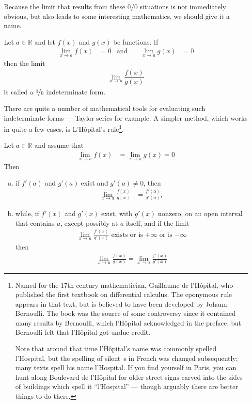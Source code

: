 Because the limit that results from these $0/0$ situations is not immediately obvious,
but also leads to some interesting mathematics, we should give it a name.
\begin{defn}
Let $a \in \mathbb{R}$ and let $f(x)$ and $g(x)$ be functions. If
\begin{align*}
  \lim_{x\to a} f(x) &= 0 & \text{and } &&
  \lim_{x\to a} g(x) &= 0
\end{align*}
then the limit
\begin{align*}
  \lim_{x\to a} \dfrac{f(x)}{g(x)}
\end{align*}
is called a $\nicefrac{0}{0}$ indeterminate form.
\end{defn}
There are quite a number of mathematical tools for evaluating such indeterminate forms
--- Taylor series for example. A simpler method, which works in quite a few cases, is
L'H\^opital's rule\footnote{
  Named for the 17th century mathematician, Guillaume de l'H\^opital, who published the
first textbook on differential calculus. The eponymous rule appears in that text, but is
believed to have been developed by Johann Bernoulli. The book was the source of some
controversy since it contained many results by Bernoulli, which l'H\^opital acknowledged
in the preface, but Bernoulli felt that l'H\^opital got undue credit.

Note that around that time l'H\^opital's name was commonly spelled l'Hospital, but the
spelling of silent~s in French was changed subsequently; many texts spell his
name l'Hospital. If you find yourself in Paris, you can hunt along Boulevard
de l'H\^opital for older street signs carved into the sides of buildings
which spell it ``l'Hospital'' --- though arguably there are better things to do
there.}.
\begin{theorem}\label{thm:APPlhopital}
Let $a\in\mathbb{R}$ and assume that
\begin{align*}
\lim_{x\to a}f(x) &= \lim_{x\to a} g(x) = 0
\end{align*}
Then
\begin{enumerate}[(a)]
\item if $f'(a)$ and $g'(a)$ exist and $g'(a)\ne 0$, then
\begin{align*}
\lim_{x\to a} \frac{f(x)}{g(x)} &=\frac{f'(a)}{g'(a)},
\end{align*}
\item while, if $f'(x)$ and $g'(x)$ exist, with $g'(x)$ nonzero, on an open interval that
contains $a$,  except possibly at $a$ itself, and if the limit
\begin{align*}
\lim\limits_{x\rightarrow a}\frac{f'(x)}{g'(x)} \text{ exists or is $+\infty$ or is $-\infty$}
\end{align*}
then
\begin{align*}
\lim_{x\to a} \frac{f(x)}{g(x)}
=\lim_{x \to a} \frac{f'(x)}{g'(x)}
\end{align*}
\end{enumerate}
\end{theorem}

